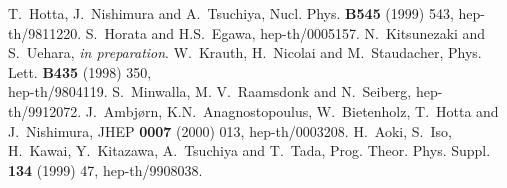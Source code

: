\documentclass[12pt,a4paper]{article}
\begin{document}
\begin{thebibliography}{99}
 T.~Hotta, J.~Nishimura and A.~Tsuchiya, Nucl. Phys. {\bf B545}
 (1999) 543, hep-th/9811220.
 S.~Horata and H.S.~Egawa, hep-th/0005157.
 N.~Kitsunezaki and S.~Uehara, {\it in preparation}.
 W.~Krauth, H.~Nicolai and M.~Staudacher, Phys. Lett. {\bf B435}
(1998) 350,\\ hep-th/9804119.
 S.~Minwalla, M. V.~Raamsdonk and N.~Seiberg, hep-th/9912072.
 J.~Ambj\o rn, K.N.~Anagnostopoulus, W.~Bietenholz, T.~Hotta and
	J.~Nishimura, JHEP {\bf 0007} (2000) 013, hep-th/0003208.
 H.~Aoki, S.~Iso, H.~Kawai, Y.~Kitazawa, A.~Tsuchiya and T.~Tada,
 Prog. Theor. Phys. Suppl. {\bf 134} (1999) 47, hep-th/9908038.
\end{thebibliography}
\end{document}
